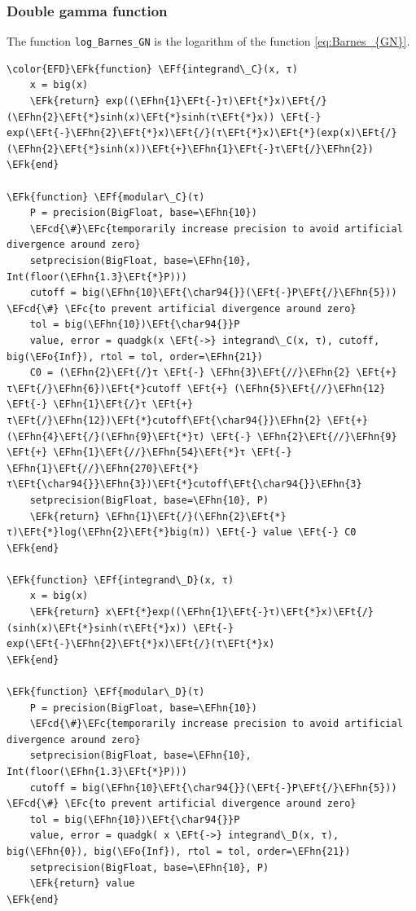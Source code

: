 \documentclass[a4paper]{article}
\numberwithin{equation}{section}
\newcommand{\EFc}[1]{\textcolor{EFc}{#1}} %
\newcommand{\EFcd}[1]{\textcolor{EFcd}{#1}} %
\newcommand{\EFk}[1]{\textcolor{EFk}{#1}} %
\newcommand{\EFf}[1]{\textcolor{EFf}{#1}} %
\newcommand{\EFt}[1]{\textcolor{EFt}{#1}} %
\newcommand{\EFo}[1]{\textcolor{EFo}{#1}} %
\newcommand{\EFhn}[1]{\textcolor{EFhn}{#1}} %
\begin{document}
\subsubsection*{Double gamma function}
\label{sec:org1873129}

The function \texttt{log\_Barnes\_GN} is the logarithm of the function \eqref{eq:Barnes_{GN}}.

\begin{Code}
\begin{Verbatim}
\color{EFD}\EFk{function} \EFf{integrand\_C}(x, τ)
    x = big(x)
    \EFk{return} exp((\EFhn{1}\EFt{-}τ)\EFt{*}x)\EFt{/}(\EFhn{2}\EFt{*}sinh(x)\EFt{*}sinh(τ\EFt{*}x)) \EFt{-} exp(\EFt{-}\EFhn{2}\EFt{*}x)\EFt{/}(τ\EFt{*}x)\EFt{*}(exp(x)\EFt{/}(\EFhn{2}\EFt{*}sinh(x))\EFt{+}\EFhn{1}\EFt{-}τ\EFt{/}\EFhn{2})
\EFk{end}

\EFk{function} \EFf{modular\_C}(τ)
    P = precision(BigFloat, base=\EFhn{10})
    \EFcd{\#}\EFc{temporarily increase precision to avoid artificial divergence around zero}
    setprecision(BigFloat, base=\EFhn{10}, Int(floor(\EFhn{1.3}\EFt{*}P)))
    cutoff = big(\EFhn{10}\EFt{\char94{}}(\EFt{-}P\EFt{/}\EFhn{5})) \EFcd{\#} \EFc{to prevent artificial divergence around zero}
    tol = big(\EFhn{10})\EFt{\char94{}}P
    value, error = quadgk(x \EFt{->} integrand\_C(x, τ), cutoff, big(\EFo{Inf}), rtol = tol, order=\EFhn{21})
    C0 = (\EFhn{2}\EFt{/}τ \EFt{-} \EFhn{3}\EFt{//}\EFhn{2} \EFt{+} τ\EFt{/}\EFhn{6})\EFt{*}cutoff \EFt{+} (\EFhn{5}\EFt{//}\EFhn{12} \EFt{-} \EFhn{1}\EFt{/}τ \EFt{+} τ\EFt{/}\EFhn{12})\EFt{*}cutoff\EFt{\char94{}}\EFhn{2} \EFt{+} (\EFhn{4}\EFt{/}(\EFhn{9}\EFt{*}τ) \EFt{-} \EFhn{2}\EFt{//}\EFhn{9} \EFt{+} \EFhn{1}\EFt{//}\EFhn{54}\EFt{*}τ \EFt{-} \EFhn{1}\EFt{//}\EFhn{270}\EFt{*}τ\EFt{\char94{}}\EFhn{3})\EFt{*}cutoff\EFt{\char94{}}\EFhn{3}
    setprecision(BigFloat, base=\EFhn{10}, P)
    \EFk{return} \EFhn{1}\EFt{/}(\EFhn{2}\EFt{*}τ)\EFt{*}log(\EFhn{2}\EFt{*}big(π)) \EFt{-} value \EFt{-} C0
\EFk{end}

\EFk{function} \EFf{integrand\_D}(x, τ)
    x = big(x)
    \EFk{return} x\EFt{*}exp((\EFhn{1}\EFt{-}τ)\EFt{*}x)\EFt{/}(sinh(x)\EFt{*}sinh(τ\EFt{*}x)) \EFt{-} exp(\EFt{-}\EFhn{2}\EFt{*}x)\EFt{/}(τ\EFt{*}x)
\EFk{end}

\EFk{function} \EFf{modular\_D}(τ)
    P = precision(BigFloat, base=\EFhn{10})
    \EFcd{\#}\EFc{temporarily increase precision to avoid artificial divergence around zero}
    setprecision(BigFloat, base=\EFhn{10}, Int(floor(\EFhn{1.3}\EFt{*}P)))
    cutoff = big(\EFhn{10}\EFt{\char94{}}(\EFt{-}P\EFt{/}\EFhn{5})) \EFcd{\#} \EFc{to prevent artificial divergence around zero}
    tol = big(\EFhn{10})\EFt{\char94{}}P
    value, error = quadgk( x \EFt{->} integrand\_D(x, τ), big(\EFhn{0}), big(\EFo{Inf}), rtol = tol, order=\EFhn{21})
    setprecision(BigFloat, base=\EFhn{10}, P)
    \EFk{return} value
\EFk{end}


\end{Verbatim}
\end{Code}
\end{document}
